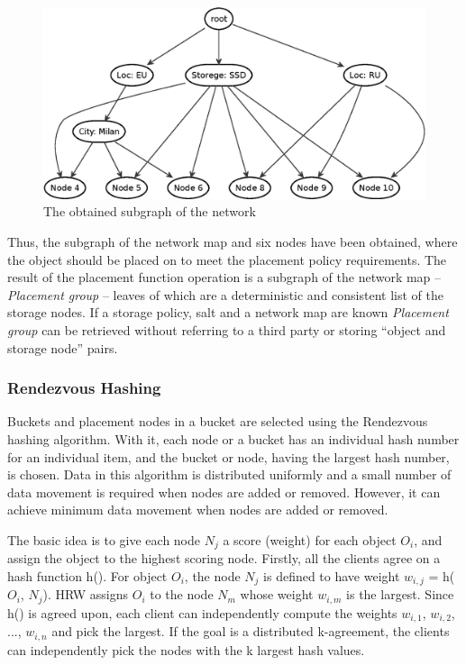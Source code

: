\documentclass[a4paper, 11pt]{article}
\begin{document}
\begin{figure}[h]
\centering
\includegraphics[scale=.62]{pic/uml_8_n_map_2.eps}
\caption{The obtained subgraph of the network}
\end{figure}

Thus, the subgraph of the network map and six nodes have been obtained, where
the object should be placed on to meet the placement policy requirements. The
result of the placement function operation is a subgraph of the network map --
\textit{Placement group} -- leaves of which are a deterministic and consistent list of
the storage nodes. If a storage policy, salt and a network map are known 
\textit{Placement group} can be retrieved without referring to a third party or storing
“object and storage node” pairs.

\subsubsection{Rendezvous Hashing}
Buckets and placement nodes in a bucket are selected using the Rendezvous hashing
algorithm. With it, each node or a bucket has an individual hash number for an
individual item, and the bucket or node, having the largest hash number, is chosen.
Data in this algorithm is distributed uniformly and a small number of data
movement is required when nodes are added or removed. However, it can achieve
minimum data movement when nodes are added or removed.

The basic idea is to give each node $N_j$ a score (weight) for each object
$O_i$, and assign the object to the highest scoring node. Firstly, all the clients
agree on a hash function h(). For object $O_i$, the node $N_j$ is defined to
have weight $w_{i,j}$ = h($O_i$, $N_j$). HRW assigns $O_i$ to the node $N_m$
whose weight $w_{i,m}$ is the largest. Since h() is agreed upon, each client can
independently compute the weights $w_{i,1}$, $w_{i,2}$, ..., $w_{i,n}$ and pick the
largest. If the goal is a distributed k-agreement, the clients can independently
pick the nodes with the k largest hash values.
\end{document}

